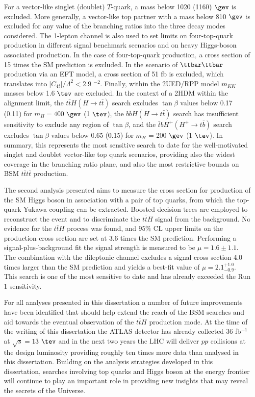 For a vector-like singlet (doublet) $T$-quark, a mass below 1020 (1160) $\gev$ is excluded. More generally, a vector-like top partner with a mass below 810 $\gev$ is excluded for any value of the branching ratios into the three decay modes considered.
The 1-lepton channel is also used to set limits on four-top-quark production in different signal benchmark scenarios and on heavy Higgs-boson associated production. In the case of four-top-quark production, a cross section of 15 times the SM prediction is excluded. In the scenario of $\ttbar\ttbar$  production via an EFT model, a cross section of 51 fb is excluded, which translates into $|C_{4t}|/\Lambda^{2} < 2.9$ \tev$^{-2}$. Finally, within the 2UED/RPP model $m_{KK}$ masses below 1.6 $\tev$ are excluded. In the context of a 2HDM within the alignment limit, the $t\bar{t}H(H\to t\bar{t})$ search excludes $\tan\beta$ values below 0.17 (0.11) for $m_{H} = 400$ $\gev$ (1 $\tev$), the $b\bar{b}H(H\to t\bar{t})$ search has insufficient sensitivity to exclude any region of $\tan\beta$, and the $\bar{t}bH^{+}(H^{+}\to t\bar{b})$ search excludes $\tan\beta$ values below 0.65 (0.15) for $m_{H}$ = 200 $\gev$ (1 $\tev$).
In summary, this represents the most sensitive search to date for the well-motivated singlet and doublet vector-like top quark scenarios, providing also the widest coverage in the branching ratio plane, and also the most restrictive bounds on BSM $t\bar{t}t\bar{t}$ production.\par
The second analysis presented aims to measure the cross section for production of the SM Higgs boson in association with a pair of top quarks, from which the top-quark Yukawa coupling can be extracted. Boosted decision trees are employed to reconstruct the event and to discriminate the $t\bar{t}H$ signal from the background. No evidence for the $t\bar{t}H$ process was found, and $95\%$ CL upper limits on the production cross section are set at 3.6 times the SM prediction.  Performing a signal-plus-background fit the signal strength is measured to be $\mu=1.6\pm1.1$.
The combination with the dileptonic channel excludes a signal cross section 4.0 times larger than the SM prediction and yields a best-fit value of $\mu=2.1^{+1.0}_{-0.9}$. This search is one of the most sensitive to date and has already exceeded the Run 1 sensitivity.\par
For all analyses presented in this dissertation a number of future improvements have been identified that should help extend the reach of the BSM searches and aid towards the eventual observation of the $t\bar{t}H$ production mode. At the time of the writing of this dissertation the ATLAS detector has already collected 36 fb$^{-1}$ at $\sqrt{s}=13$ $\tev$ and in the next two years the LHC will deliver $pp$ collisions at the design luminosity providing roughly ten times more data than analysed in this dissertation.
Building on the analysis strategies developed in this dissertation, searches involving top quarks and Higgs boson at the energy frontier will continue to play an important role in providing new insights that may reveal the secrets of the Universe.\\ 

